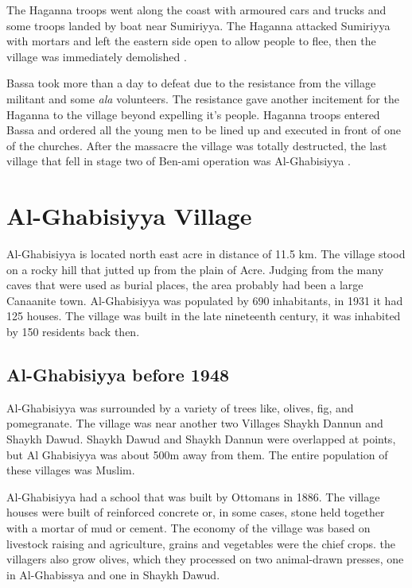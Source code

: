 The Haganna troops went along the coast with armoured cars and trucks and some troops landed by boat near Sumiriyya. The Haganna  attacked Sumiriyya with mortars and left the eastern side open to allow people to flee, then the village was immediately demolished \citep{Morris2004, Morris2008}.

Bassa took more than a day to defeat due to the resistance from the village militant and some \textit{\acrfull{ala}} volunteers. The resistance gave another incitement for the Haganna to  the village beyond expelling it's people. Haganna troops entered Bassa and ordered all the young men to be lined up and executed in front of one of the churches. After the massacre the village was totally destructed, the last village that fell in stage two of Ben-ami operation was Al-Ghabisiyya \citep{Morris2004, Pappe2006}.  



\section{Al-Ghabisiyya Village}

Al-Ghabisiyya is located north east acre in distance of 11.5 km. The village stood on a rocky hill that jutted up from the plain of Acre. Judging from the many caves that were used as burial places, the area probably had been a large Canaanite town.
Al-Ghabisiyya was populated by 690 inhabitants, in 1931 it had 125 houses. The village was built in the late nineteenth century, it was inhabited by 150 residents back then\citep{Khalidi2015}.
\subsection{Al-Ghabisiyya before 1948}

 Al-Ghabisiyya was surrounded by a variety of trees like, olives, fig, and pomegranate. The village was near another two Villages Shaykh Dannun and Shaykh Dawud. Shaykh Dawud and Shaykh Dannun were overlapped at points, but Al Ghabisiyya was about 500m away from them. The entire population of these villages was Muslim. 

Al-Ghabisiyya had a school that was built by Ottomans in 1886. The village houses were built of reinforced concrete or, in some cases, stone held together with a mortar of mud or cement. The economy of the village was based on livestock raising and agriculture, grains and vegetables were the chief crops. the villagers also grow olives, which they processed on two animal-drawn presses, one in Al-Ghabissya and one in Shaykh Dawud.

